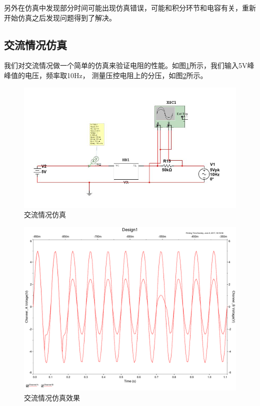 \documentclass[UTF8,a4paper]{paper}
\begin{document}
另外在仿真中发现部分时间可能出现仿真错误，可能和积分环节和电容有关，重新开始仿真之后发现问题得到了解决。

\subsection{交流情况仿真}
我们对交流情况做一个简单的仿真来验证电阻的性能。如图\ref{3}所示，我们输入5V峰峰值的电压，频率取10Hz，
测量压控电阻上的分压，如图\ref{4}所示。

\begin{figure}
\centering
\includegraphics[width=\textwidth]{3.jpg}
\caption{交流情况仿真}
\label{3}
\end{figure}
\begin{figure}
\centering
\includegraphics[width=\textwidth]{1.pdf}
\caption{交流情况仿真效果}
\label{4}
\end{figure}
\end{document}
